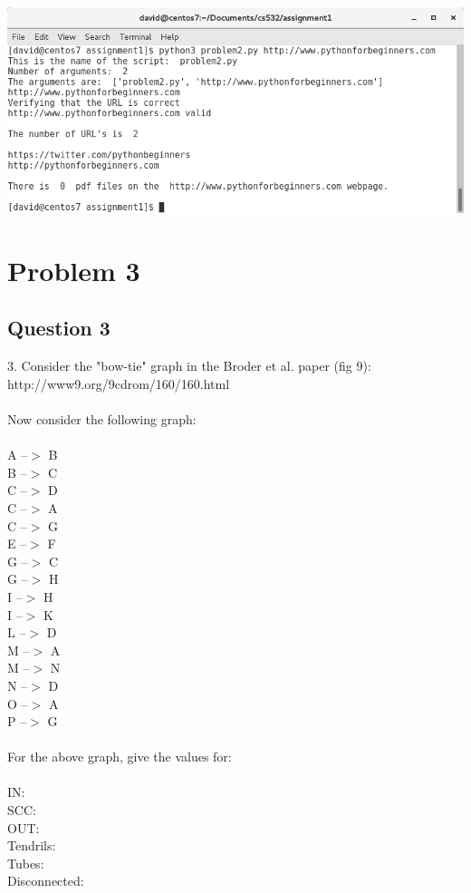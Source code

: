 \documentclass[10pt,letterpaper]{article}
\begin{document}
\includegraphics[scale=.25]{problem2req4b.png}

\pagebreak%


\section{Problem 3}
\subsection{Question 3}
3.  Consider the "bow-tie" graph in the Broder et al. paper (fig 9):\\ 
    http://www9.org/9cdrom/160/160.html\\ 
\\ 
    Now consider the following graph:\\ 
\\ 
    A --$>$ B\\ 
    B --$>$ C\\ 
    C --$>$ D\\ 
    C --$>$ A\\ 
    C --$>$ G\\ 
    E --$>$ F\\ 
    G --$>$ C\\ 
    G --$>$ H\\ 
    I --$>$ H\\ 
    I --$>$ K\\ 
    L --$>$ D\\
    M --$>$ A\\ 
    M --$>$ N\\ 
    N --$>$ D\\ 
    O --$>$ A\\ 
    P --$>$ G\\ 
\\
    For the above graph, give the values for:\\ 
\\
    IN:\\ 
    SCC:\\ 
    OUT:\\ 
    Tendrils:\\
    Tubes:\\ 
    Disconnected:\\ 
\\ 
\end{document}

